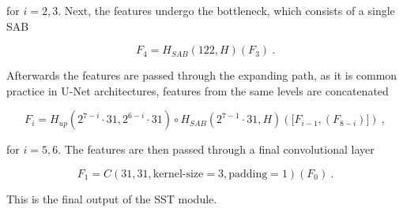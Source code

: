 for $i=2, 3$. Next, the features undergo the bottleneck, which consists of a single SAB

    \begin{equation*}
        F_4 = H_{SAB}(122, H)(F_{3}) ~.
    \end{equation*}

Afterwards the features are passed through the expanding path, 
as it is common practice in U-Net architectures,
features from the same levels are concatenated

    \begin{equation*}
        F_i =  H_{up}(2^{7 - i} \cdot 31, 2^{6 - i} \cdot 31) \circ H_{SAB}(2^{7-1} \cdot 31, H) \left( \big[F_{i-1}, (F_{8 - i}) \big] \right) ~,
    \end{equation*}

for $i = 5, 6$.
The features are then passed through a final convolutional layer

    \begin{equation*}
       F_1 = C(31, 31, \text{kernel-size}=3, \text{padding}=1)(F_0) ~.
    \end{equation*}

This is the final output of the SST module.